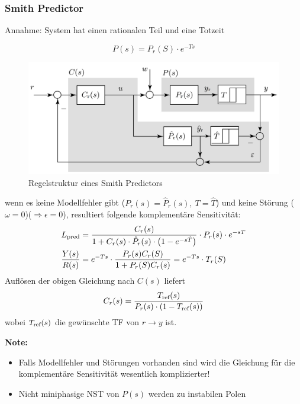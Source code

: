     \subsubsection{Smith Predictor}
    Annahme: System hat einen rationalen Teil und eine Totzeit
    
    \[P(s) = P_r(S)\cdot e^{-Ts}\]
    \begin{figure}[H]
        \centering
        \includegraphics[width = 0.55\linewidth]{images/02/Smithpredictor.jpg}
        \caption{Regelstruktur eines Smith Predictors}
    \end{figure}
    
    wenn es keine Modellfehler gibt ($P_r(s) = \hat P_r(s),\ T = \hat T$) und keine Störung ($\omega = 0$)($\Rightarrow \epsilon = 0$), resultiert folgende komplementäre Sensitivität:
    \begin{align*}
        L_{\textnormal{pred}} &= \frac{C_r(s)}{1 + C_r(s)\cdot\hat{P}_r(s)\cdot\big(1 - e^{-s\hat{T}}\big)}\cdot P_r(s)\cdot e^{-sT}\\
        \frac{Y(s)}{R(s)} &= e^{-Ts}\cdot\frac{P_r(s)C_r(S)}{1+P_r(S)C_r(s)} = e^{-Ts}\cdot T_r(S)
    \end{align*}
    Auflösen der obigen Gleichung nach $C(s)$ liefert
    \begin{equation*}
        C_r(s) = \frac{T_{\textnormal{ref}}(s)}{P_r(s)\cdot(1-T_{\textnormal{ref}}(s))}
    \end{equation*}
    wobei $T_\textnormal{ref}(s)$ die gewünschte TF von $r\rightarrow y$ ist.
    
    \textbf{Note:} 
    \begin{itemize}
        \item Falls Modellfehler und Störungen vorhanden sind wird die Gleichung für die komplementäre Sensitivität wesentlich komplizierter!
        
        \item Nicht miniphasige NST von $P(s)$ werden zu instabilen Polen 
    \end{itemize}
    
